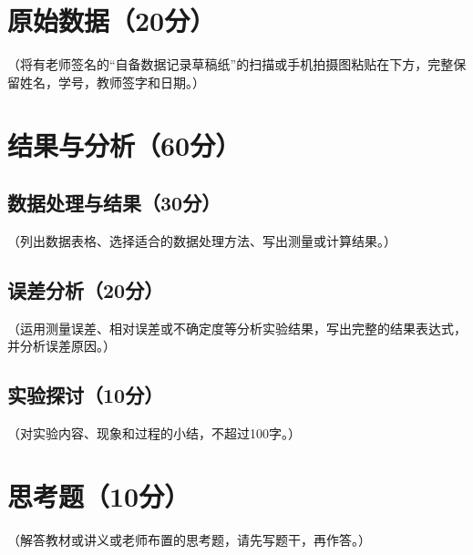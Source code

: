\documentclass[yuxi]{../template/Report}%
\begin{document}
\begin{fullreportonly}
\section{原始数据（20分）}
（将有老师签名的“自备数据记录草稿纸”的扫描或手机拍摄图粘贴在下方，完整保留姓名，学号，教师签字和日期。）

\section{结果与分析（60分）}
\subsection{数据处理与结果（30分）}
（列出数据表格、选择适合的数据处理方法、写出测量或计算结果。）

\subsection{误差分析（20分）}
（运用测量误差、相对误差或不确定度等分析实验结果，写出完整的结果表达式，并分析误差原因。）

\subsection{实验探讨（10分）}
（对实验内容、现象和过程的小结，不超过100字。）

\section{思考题（10分）}
（解答教材或讲义或老师布置的思考题，请先写题干，再作答。）
\end{fullreportonly}
\insertnotes
\end{document}

